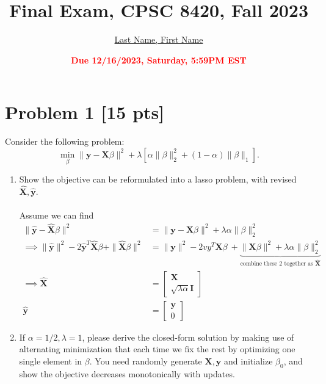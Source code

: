 \documentclass[11pt]{article}
\title{{\bf Final Exam, CPSC 8420, Fall 2023}}
\author{\Large\underline{Last Name, First Name}}%
\date{\textbf{\Large\textcolor{red}{Due 12/16/2023, Saturday, 5:59PM EST}}}
\newcommand{\mtx}[1]{\mathbf{#1}}
\newcommand{\vct}[1]{\mathbf{#1}}
\def \mX {\mtx{X}}
\def \vy {\vct{y}}
\begin{document}
\maketitle

\section*{Problem 1 [15 pts]}
Consider the following problem:
\begin{equation}
\min_{\beta} \|\vy-\mX\beta\|^2+\lambda[\alpha\|\beta\|^2_2+(1-\alpha)\|\beta\|_1].
\end{equation}
\begin{enumerate}
	\item Show the objective can be reformulated into a lasso problem, with revised 
	$\hat{\mX}, \hat{\vy}$.\\
	\\Assume we can find
	\begin{align*}
		\|\hat{\vy}-\hat{\mX}\beta\|^2 &= \|\vy-\mX\beta\|^2+\lambda\alpha\|\beta\|^2_2\\
		\implies \|\hat{\vy}\|^2 - 2\hat{\vy}^T\hat{\mX}\beta + \|\hat{\mX}\beta\|^2 &= \|\vy\|^2 - 2vy^T\mX\beta\ + 
		\underbrace{\|\mX\beta\|^2 + \lambda\alpha\|\beta\|^2_2}_{\text{combine these 2 together as }\hat{\mX}}\\
		\implies \hat{\mX} &=  \begin{bmatrix}
			\mX\\
			\sqrt{\lambda\alpha}\vct{I}
			\end{bmatrix}\\
			\hat{\vy} &= \begin{bmatrix}
				\vy\\
				0
				\end{bmatrix}
	\end{align*}

	\item If $\alpha=1/2,\lambda=1$, please derive the closed-form solution by making use of alternating minimization that each time we fix the rest by optimizing one single element in $\beta$. You need randomly generate $\mX, \vy$ and initialize  $\beta_0$, and show the objective decreases monotonically with updates.
	

\end{enumerate}
\end{document}
